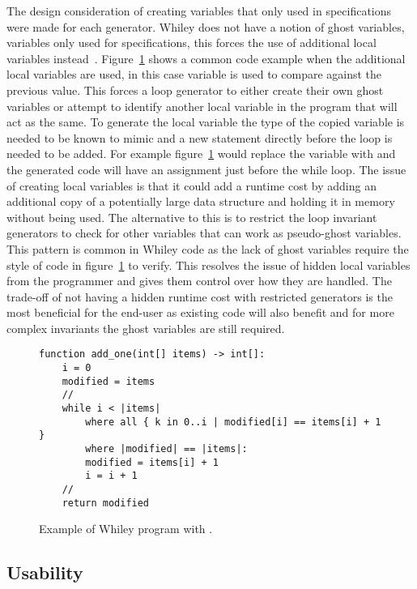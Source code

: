 The design consideration of creating variables that only used in specifications
were made for each generator.
Whiley does not have a notion of ghost variables, variables only used for
specifications, this forces the use of additional local variables instead~\cite{whiley-origin}.
Figure~\ref{lst:vars} shows a common code example when the additional local
variables are used, in this case  variable is used to compare
against the previous value.
This forces a loop generator to either create their own ghost variables or
attempt to identify another local variable in the program that will act as the
same.
To generate the local variable the type of the copied variable is needed to be
known to mimic and a new statement directly before the loop is needed to be
added.
For example figure~\ref{lst:vars} would replace the  variable
with  and the generated code will have an assignment just before
the while loop.
The issue of creating local variables is that it could add a runtime cost by
adding an additional copy of a potentially large data structure
and holding it in memory without being used.
The alternative to this is to restrict the loop invariant generators to check
for other variables that can work as pseudo-ghost variables.
This pattern is common in Whiley code as the lack of ghost variables require
the style of code in figure~\ref{lst:vars} to verify.
This resolves the issue of hidden local variables from the programmer
and gives them control over how they are handled.
The trade-off of not having a hidden runtime cost with restricted generators
is the most beneficial for the end-user as existing code will also benefit
and for more complex invariants the ghost variables are still required.

\begin{figure}[ht]
\begin{lstlisting}
function add_one(int[] items) -> int[]:
    i = 0
    modified = items
    //
    while i < |items|
        where all { k in 0..i | modified[i] == items[i] + 1 }
        where |modified| == |items|:
        modified = items[i] + 1
        i = i + 1
    //
    return modified
\end{lstlisting}
\caption{Example of Whiley program with .}
\label{lst:vars}
\end{figure}

\subsection{Usability}

